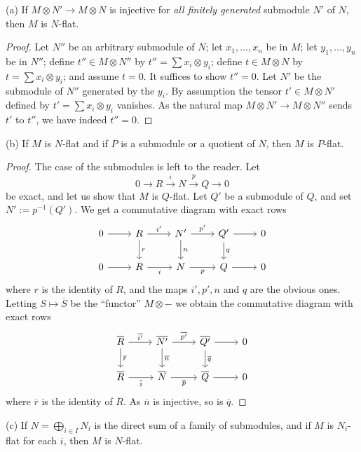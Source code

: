 \documentclass[parskip=half,fontsize=12pt]{scrartcl}%
\begin{document}
(a) If $M\otimes N'\to M\otimes N$ is injective for \emph{all finitely generated} submodule $N'$ of $N$, then $M$ is $N$-flat.

\begin{proof} 
Let $N''$ be an arbitrary submodule of $N$; let $x_1,\dots,x_n$ be in $M$; let $y_1,\dots,y_n$ be in $N''$; define $t''\in M\otimes N''$ by $t''=\sum x_i\otimes y_i$; define $t\in M\otimes N$ by $t=\sum x_i\otimes y_i$; and assume $t=0$. It suffices to show $t''=0$. Let $N'$ be the submodule of $N''$ generated by the $y_i$. By assumption the tensor $t'\in M\otimes N'$ defined by $t'=\sum x_i\otimes y_i$ vanishes. As the natural map $M\otimes N'\to M\otimes N''$ sends $t'$ to $t''$, we have indeed $t''=0$. 
\end{proof}

(b) If $M$ is $N$-flat and if $P$ is a submodule or a quotient of $N$, then $M$ is $P$-flat.%

\begin{proof} 
The case of the submodules is left to the reader. Let 
$$
0\to R\xrightarrow iN\xrightarrow pQ\to0
$$ 
be exact, and let us show that $M$ is $Q$-flat. Let $Q'$ be a submodule of $Q$, and set $N':=p^{-1}(Q')$. We get a commutative diagram with exact rows
$$
\begin{tikzcd}
0\ar[r]&R\ar[d,"r"]\ar[r,"i'"]&N'\ar[d,"n"]\ar[r,"p'"]& Q'\ar[d,"q"]\ar[r]&0\\ 
0\ar[r]&R\ar[r,"i"']&N\ar[r,"p"']& Q\ar[r]&0
\end{tikzcd}
$$ 
where $r$ is the identity of $R$, and the maps $i',p',n$ and $q$ are the obvious ones. Letting $S\mapsto\overline S$ be the ``functor'' $M\otimes-$ we obtain the commutative diagram with exact rows
$$
\begin{tikzcd}
\overline R\ar[d,"\overline r"]\ar[r,"\overline{i'}"]&\overline{N'}\ar[d,"\overline n"]\ar[r,"\overline{p'}"]& \overline{Q'}\ar[d,"\overline q"]\ar[r]&0\\ 
\overline R\ar[r,"\overline i"']&\overline N\ar[r,"\overline p"']& \overline Q\ar[r]&0
\end{tikzcd}
$$ 
where $\overline r$ is the identity of $\overline R$. As $\overline n$ is injective, so is $\overline q$. 
\end{proof}

(c) If $N=\bigoplus_{i\in I}N_i$ is the direct sum of a family of submodules, and if $M$ is $N_i$-flat for each $i$, then $M$ is $N$-flat.%
\end{document}
